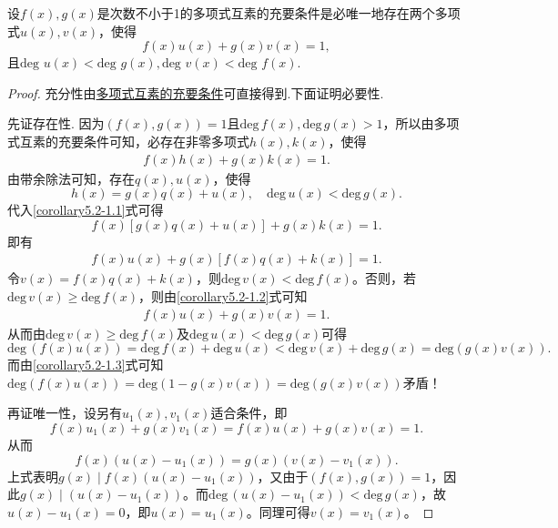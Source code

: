 \documentclass[../../main.tex]{subfiles}%
\begin{document}
\begin{corollary}\label{corollary:次数不小于1的多项式互素的充要条件}
设\(f(x),g(x)\)是次数不小于1的多项式互素的充要条件是必唯一地存在两个多项式\(u(x),v(x)\)，使得
\[
f(x)u(x)+g(x)v(x)=1,
\]
且\(\text{deg }u(x)<\text{deg }g(x),\text{deg }v(x)<\text{deg }f(x)\).
\end{corollary}
\begin{proof}

充分性由\hyperref[theorem:多项式互素的充要条件]{多项式互素的充要条件}可直接得到.下面证明必要性.

先证存在性.
因为\(( f(x),g(x) ) = 1\)且\(\mathrm{deg}\,f(x),\mathrm{deg}\,g(x) > 1\)，所以由多项式互素的充要条件可知，必存在非零多项式\(h(x),k(x)\)，使得
\begin{align}
f(x)h(x)+g(x)k(x)=1. \label{corollary5.2-1.1} 
\end{align}
由带余除法可知，存在\(q(x),u(x)\)，使得
\[
h(x)=g(x)q(x)+u(x),\quad \mathrm{deg}\,u(x)<\mathrm{deg}\,g(x).
\]
代入\eqref{corollary5.2-1.1}式可得
\[
f(x)[g(x)q(x)+u(x)]+g(x)k(x)=1.
\]
即有
\begin{align}
f(x)u(x)+g(x)[f(x)q(x)+k(x)] = 1. \label{corollary5.2-1.2}  
\end{align}
令\(v(x)=f(x)q(x)+k(x)\)，则\(\mathrm{deg}\,v(x)<\mathrm{deg}\,f(x)\)。否则，若\(\mathrm{deg}\,v(x)\geqslant \mathrm{deg}\,f(x)\)，则由\eqref{corollary5.2-1.2}式可知
\begin{align}
f(x)u(x)+g(x)v(x)=1. \label{corollary5.2-1.3}  
\end{align}
从而由\(\mathrm{deg}\,v(x)\geqslant \mathrm{deg}\,f(x)\)及\(\mathrm{deg}\,u(x)<\mathrm{deg}\,g(x)\)可得
\[
\mathrm{deg}\,(f(x)u(x))=\mathrm{deg}\,f(x)+\mathrm{deg}\,u(x)<\mathrm{deg}\,v(x)+\mathrm{deg}\,g(x)=\mathrm{deg}(g(x)v(x)).
\]
而由\eqref{corollary5.2-1.3}式可知\(\mathrm{deg}\left( f\left( x \right) u\left( x \right) \right) =\mathrm{deg}\left( 1-g\left( x \right) v\left( x \right) \right) =\mathrm{deg}\left( g\left( x \right) v\left( x \right) \right) \)矛盾！

再证唯一性，设另有\(u_1(x),v_1(x)\)适合条件，即
\[
f(x)u_1(x)+g(x)v_1(x)=f(x)u(x)+g(x)v(x)=1.
\]
从而
\[
f(x)(u(x)-u_1(x))=g(x)(v(x)-v_1(x)).
\]
上式表明\(g(x)\mid f(x)(u(x)-u_1(x))\)，又由于\(( f(x),g(x) ) = 1\)，因此\(g(x)\mid (u(x)-u_1(x))\)。而\(\mathrm{deg}\,(u(x)-u_1(x))<\mathrm{deg}\,g(x)\)，故\(u(x)-u_1(x)=0\)，即\(u(x)=u_1(x)\)。同理可得\(v(x)=v_1(x)\)。

\end{proof}
\end{document}
